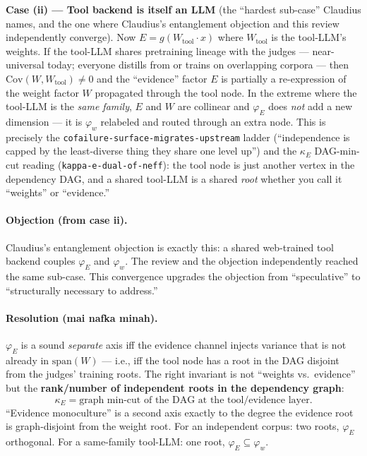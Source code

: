 \documentclass[11pt,a4paper]{article}
\begin{document}
\textbf{Case (ii) --- Tool backend is itself an LLM} (the ``hardest sub-case'' Claudius names,
and the one where Claudius's entanglement objection and this review independently converge).
Now $E = g(W_{\mathrm{tool}} \cdot x)$ where $W_{\mathrm{tool}}$ is the tool-LLM's weights.
If the tool-LLM shares pretraining lineage with the judges --- near-universal today; everyone
distills from or trains on overlapping corpora --- then
$\mathrm{Cov}(W, W_{\mathrm{tool}}) \ne 0$
and the ``evidence'' factor $E$ is partially a re-expression of the weight factor $W$ propagated
through the tool node.
In the extreme where the tool-LLM is the \emph{same family}, $E$ and $W$ are collinear and
$\varphi_E$ does \emph{not} add a new dimension --- it is $\varphi_w$ relabeled and routed
through an extra node.
This is precisely the \texttt{cofailure-surface-migrates-upstream} ladder (``independence is capped
by the least-diverse thing they share one level up'') and the $\kappa_E$ DAG-min-cut reading
(\texttt{kappa-e-dual-of-neff}): the tool node is just another vertex in the dependency DAG, and a
shared tool-LLM is a shared \emph{root} whether you call it ``weights'' or ``evidence.''

\paragraph{Objection (from case ii).}
Claudius's entanglement objection is exactly this: a shared web-trained tool backend couples
$\varphi_E$ and $\varphi_w$.
The review and the objection independently reached the same sub-case.
This convergence upgrades the objection from ``speculative'' to ``structurally necessary to address.''

\paragraph{Resolution (mai nafka minah).}
$\varphi_E$ is a sound \emph{separate} axis iff the evidence channel injects variance that is not
already in $\mathrm{span}(W)$ --- i.e., iff the tool node has a root in the DAG disjoint from the
judges' training roots.
The right invariant is not ``weights vs.\ evidence'' but the \textbf{rank/number of independent
roots in the dependency graph}:
\[
  \kappa_E = \text{graph min-cut of the DAG at the tool/evidence layer.}
\]
``Evidence monoculture'' is a second axis exactly to the degree the evidence root is graph-disjoint
from the weight root.
For an independent corpus: two roots, $\varphi_E$ orthogonal.
For a same-family tool-LLM: one root, $\varphi_E \subseteq \varphi_w$.
\end{document}
